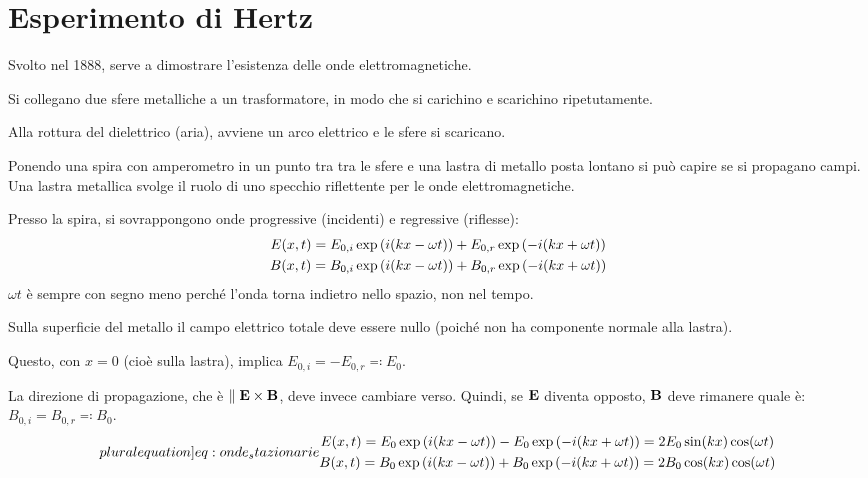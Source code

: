 \section{Esperimento di Hertz}

Svolto nel 1888, serve a dimostrare l'esistenza delle onde elettromagnetiche.

Si collegano due sfere metalliche a un trasformatore, in modo che si carichino e scarichino ripetutamente.

Alla rottura del dielettrico (aria), avviene un arco elettrico e le sfere si scaricano.

Ponendo una spira con amperometro in un punto tra tra le sfere e una lastra di metallo posta lontano si può capire se si propagano campi.
Una lastra metallica svolge il ruolo di uno specchio riflettente per le onde elettromagnetiche.

Presso la spira, si sovrappongono onde progressive (incidenti) e regressive (riflesse):
\begin{subequations}
\begin{gather}
    E(x, t) = E_{0,i}\operatorname{exp}\left( i(kx - \omega t) \right) + E_{0,r}\operatorname{exp}\left( -i(kx + \omega t) \right) \\
    B(x, t) = B_{0,i}\operatorname{exp}\left( i(kx - \omega t) \right) + B_{0,r}\operatorname{exp}\left( -i(kx + \omega t) \right)
\end{gather}
\end{subequations}
$\omega t$ è sempre con segno meno perché l'onda torna indietro nello spazio, non nel tempo.

Sulla superficie del metallo il campo elettrico totale deve essere nullo (poiché non ha componente normale alla lastra).

Questo, con $x = 0$ (cioè sulla lastra), implica $E_{0,i} = - E_{0,r} \eqcolon E_0$.

La direzione di propagazione, che è $\parallel \mathbf{E} \times \mathbf{B}$, deve invece cambiare verso.
Quindi, se $\mathbf{E}$ diventa opposto, $\mathbf{B}$ deve rimanere quale è: $B_{0,i} = B_{0,r} \eqcolon B_0$.
\begin{subequations}
\label[pluralequation]{eq:onde_stazionarie}
\begin{gather}
    E(x, t) = E_0\exp{\im(kx - \omega t)} - E_0\exp{-\im(kx + \omega t)}
    = 2 E_0 \sin(kx) \cos(\omega t) \\
    B(x, t) = B_0\exp{\im(kx - \omega t)} + B_0\exp{-\im(kx + \omega t)}
    = 2 B_0 \cos(kx) \cos(\omega t)
\end{gather}
\end{subequations}


